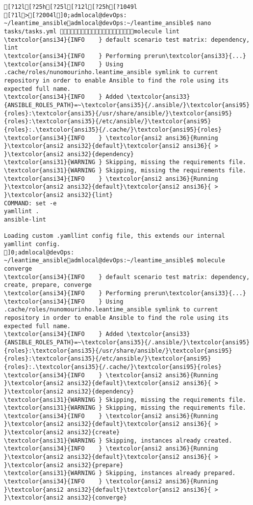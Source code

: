 \documentclass{scrartcl}
\begin{document}
\begin{Verbatim}
[?12l[?25h[?25l[?12l[?25h[?1049l
[?1l>[?2004l]0;admlocal@devOps: ~/leantime_ansibleadmlocal@devOps:~/leantime_ansible$ nano tasks/tasks.yml molecule lint
\textcolor{ansi34}{INFO    } default scenario test matrix: dependency, lint
\textcolor{ansi34}{INFO    } Performing prerun\textcolor{ansi33}{...}
\textcolor{ansi34}{INFO    } Using .cache/roles/nunomourinho.leantime_ansible symlink to current repository in order to enable Ansible to find the role using its expected full name.
\textcolor{ansi34}{INFO    } Added \textcolor{ansi33}{ANSIBLE_ROLES_PATH}=~\textcolor{ansi35}{/.ansible/}\textcolor{ansi95}{roles}:\textcolor{ansi35}{/usr/share/ansible/}\textcolor{ansi95}{roles}:\textcolor{ansi35}{/etc/ansible/}\textcolor{ansi95}{roles}:.\textcolor{ansi35}{/.cache/}\textcolor{ansi95}{roles}
\textcolor{ansi34}{INFO    } \textcolor{ansi2 ansi36}{Running }\textcolor{ansi2 ansi32}{default}\textcolor{ansi2 ansi36}{ > }\textcolor{ansi2 ansi32}{dependency}
\textcolor{ansi31}{WARNING } Skipping, missing the requirements file.
\textcolor{ansi31}{WARNING } Skipping, missing the requirements file.
\textcolor{ansi34}{INFO    } \textcolor{ansi2 ansi36}{Running }\textcolor{ansi2 ansi32}{default}\textcolor{ansi2 ansi36}{ > }\textcolor{ansi2 ansi32}{lint}
COMMAND: set -e
yamllint .
ansible-lint

Loading custom .yamllint config file, this extends our internal yamllint config.
]0;admlocal@devOps: ~/leantime_ansibleadmlocal@devOps:~/leantime_ansible$ molecule converge
\textcolor{ansi34}{INFO    } default scenario test matrix: dependency, create, prepare, converge
\textcolor{ansi34}{INFO    } Performing prerun\textcolor{ansi33}{...}
\textcolor{ansi34}{INFO    } Using .cache/roles/nunomourinho.leantime_ansible symlink to current repository in order to enable Ansible to find the role using its expected full name.
\textcolor{ansi34}{INFO    } Added \textcolor{ansi33}{ANSIBLE_ROLES_PATH}=~\textcolor{ansi35}{/.ansible/}\textcolor{ansi95}{roles}:\textcolor{ansi35}{/usr/share/ansible/}\textcolor{ansi95}{roles}:\textcolor{ansi35}{/etc/ansible/}\textcolor{ansi95}{roles}:.\textcolor{ansi35}{/.cache/}\textcolor{ansi95}{roles}
\textcolor{ansi34}{INFO    } \textcolor{ansi2 ansi36}{Running }\textcolor{ansi2 ansi32}{default}\textcolor{ansi2 ansi36}{ > }\textcolor{ansi2 ansi32}{dependency}
\textcolor{ansi31}{WARNING } Skipping, missing the requirements file.
\textcolor{ansi31}{WARNING } Skipping, missing the requirements file.
\textcolor{ansi34}{INFO    } \textcolor{ansi2 ansi36}{Running }\textcolor{ansi2 ansi32}{default}\textcolor{ansi2 ansi36}{ > }\textcolor{ansi2 ansi32}{create}
\textcolor{ansi31}{WARNING } Skipping, instances already created.
\textcolor{ansi34}{INFO    } \textcolor{ansi2 ansi36}{Running }\textcolor{ansi2 ansi32}{default}\textcolor{ansi2 ansi36}{ > }\textcolor{ansi2 ansi32}{prepare}
\textcolor{ansi31}{WARNING } Skipping, instances already prepared.
\textcolor{ansi34}{INFO    } \textcolor{ansi2 ansi36}{Running }\textcolor{ansi2 ansi32}{default}\textcolor{ansi2 ansi36}{ > }\textcolor{ansi2 ansi32}{converge}


\end{Verbatim}
\end{document}
